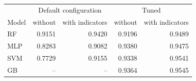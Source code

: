 \begin{tabular}{lrrrr}
\toprule
 & \multicolumn{2}{c}{Default configuration} & \multicolumn{2}{c}{Tuned} \\
Model & without & with indicators & without & with indicators \\
\midrule
RF & 0.9151 & 0.9420 & 0.9196 & 0.9489 \\
MLP & 0.8283 & 0.9082 & 0.9380 & 0.9475 \\
SVM & 0.7729 & 0.9155 & 0.9338 & 0.9541 \\
GB & -- & -- & 0.9364 & 0.9545 \\
\bottomrule
\end{tabular}
